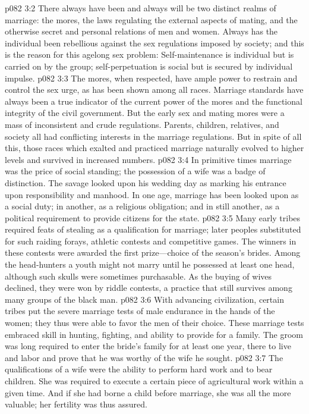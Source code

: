 \vs p082 3:2 There always have been and always will be two distinct realms of marriage: the mores, the laws regulating the external aspects of mating, and the otherwise secret and personal relations of men and women. Always has the individual been rebellious against the sex regulations imposed by society; and this is the reason for this agelong sex problem: Self\hyp{}maintenance is individual but is carried on by the group; self\hyp{}perpetuation is social but is secured by individual impulse.
\vs p082 3:3 The mores, when respected, have ample power to restrain and control the sex urge, as has been shown among all races. Marriage standards have always been a true indicator of the current power of the mores and the functional integrity of the civil government. But the early sex and mating mores were a mass of inconsistent and crude regulations. Parents, children, relatives, and society all had conflicting interests in the marriage regulations. But in spite of all this, those races which exalted and practiced marriage naturally evolved to higher levels and survived in increased numbers.
\pc \vs p082 3:4 In primitive times marriage was the price of social standing; the possession of a wife was a badge of distinction. The savage looked upon his wedding day as marking his entrance upon responsibility and manhood. In one age, marriage has been looked upon as a social duty; in another, as a religious obligation; and in still another, as a political requirement to provide citizens for the state.
\vs p082 3:5 Many early tribes required feats of stealing as a qualification for marriage; later peoples substituted for such raiding forays, athletic contests and competitive games. The winners in these contests were awarded the first prize---choice of the season’s brides. Among the head\hyp{}hunters a youth might not marry until he possessed at least one head, although such skulls were sometimes purchasable. As the buying of wives declined, they were won by riddle contests, a practice that still survives among many groups of the black man.
\vs p082 3:6 With advancing civilization, certain tribes put the severe marriage tests of male endurance in the hands of the women; they thus were able to favor the men of their choice. These marriage tests embraced skill in hunting, fighting, and ability to provide for a family. The groom was long required to enter the bride’s family for at least one year, there to live and labor and prove that he was worthy of the wife he sought.
\vs p082 3:7 The qualifications of a wife were the ability to perform hard work and to bear children. She was required to execute a certain piece of agricultural work within a given time. And if she had borne a child before marriage, she was all the more valuable; her fertility was thus assured.
